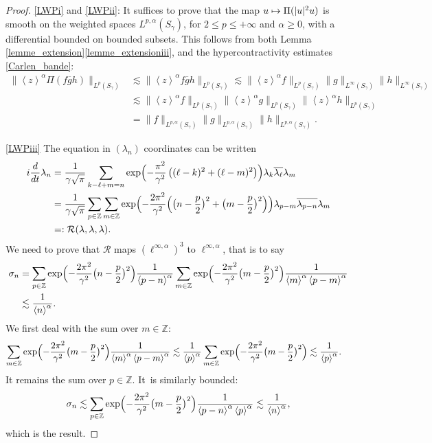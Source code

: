 \documentclass[10pt]{amsart}
\newcommand\mto{\mathchoice{\longmapsto}{\mapsto}{\mapsto}{\mapsto}}
\theoremstyle{definition}
\let\EE\exp
\let\ov\overline
\newcommand\Z{\mathbb Z}
\newcommand{\pa}[1]{\left(#1\right)}
\newcommand{\bra}[1]{\left\langle #1 \right\rangle}
\providecommand{\skpt}{\par\smallskip\noindent}
\begin{document}
\skpt
\begin{proof}
\eqref{LWPi} and \eqref{LWPii}: It suffices to prove that the map $ u \mto \Pi(|u|^2u)$ is smooth on the weighted spaces $L^{p,\alpha}(S_\gamma)$, for $2 \leq p \leq +\infty$ and $\alpha \geq 0$, with a differential bounded on bounded subsets. This follows from both Lemma \ref{lemme_extension}\eqref{lemme_extensioniii}, and the hypercontractivity estimates \eqref{Carlen_bande}:
\begin{align*}
\|\bra{z}^\alpha\Pi(f\ov{g}h)\|_{L^{p}(S_{\gamma})} &\lesssim \|\bra{z}^\alpha f\ov{g}h\|_{L^{p}(S_{\gamma})} \lesssim \|\bra{z}^\alpha f\|_{L^{p}(S_{\gamma})} \|g\|_{L^{\infty}(S_{\gamma})}\|h\|_{L^{\infty}(S_{\gamma})} \\
& \lesssim \|\bra{z}^\alpha f\|_{L^{p}(S_{\gamma})}\|\bra{z}^\alpha g\|_{L^{p}(S_{\gamma})}\|\bra{z}^\alpha h\|_{L^{p}(S_{\gamma})} \\
& = \| f\|_{L^{p,\alpha}(S_{\gamma})} \| g\|_{L^{p,\alpha}(S_{\gamma})} \| h\|_{L^{p,\alpha}(S_{\gamma})}.
\end{align*}

\eqref{LWPiii} The equation in $(\lambda_n)$ coordinates can be written
\begin{align*}
i \frac{d}{dt} \lambda_n &= \frac{1}{\gamma\sqrt{\pi}}\sum_{k-\ell+m=n}\EE \Bigl({-\frac{\pi^2}{\gamma^2}\pa{(\ell-k)^2+(\ell-m)^2}}\Bigr) \lambda_{k} \ov{\lambda_{\ell}} \lambda_{m} \\
&= \frac{1}{\gamma\sqrt{\pi}}\sum_{p\in\Z}\sum_{m\in\Z}\EE \Bigl({-\frac{2\pi^2}{\gamma^2}\Bigl(\bigl(n-\frac{p}{2}\bigr)^2+\bigl(m-\frac{p}{2}\bigr)^2}\Bigr)\Bigr) \lambda_{p-m} \ov{\lambda_{p-n}}\lambda_{m}\\
& =: \mathcal{R}(\lambda,\lambda,\lambda).
\end{align*}
We need to prove that $\mathcal{R}$ maps $(\ell^{\infty,\alpha})^3$ to $\ell^{\infty,\alpha}$, that is to say
\begin{align*}
\sigma_n &= \sum_{p\in\Z} \EE\Bigl({-\frac{2\pi^2}{\gamma^2}\bigl({n-\frac{p}{2}}}\bigr)^2\Bigr) \frac{1}{\bra{p-n}^\alpha} \sum_{m\in\Z} \EE\Bigl({-\frac{2\pi^2}{\gamma^2}\bigl({m-\frac{p}{2}}}\bigr)^2\Bigr) \frac{1}{\bra{m}^\alpha\bra{p-m}^\alpha} \\
&\lesssim \frac{1}{\bra{n}^\alpha}.
\end{align*}
We first deal with the sum over $m \in \Z$:
\begin{align*}
\sum_{m\in\Z}\EE\Bigl({-\frac{2\pi^2}{\gamma^2}\bigl({m-\frac{p}{2}}}\bigr)^2\Bigr) \frac{1}{\bra{m}^\alpha\bra{p-m}^\alpha} &\lesssim \frac{1}{\bra{p}^\alpha} \sum_{m\in\Z}\EE\Bigl({-\frac{2\pi^2}{\gamma^2}\bigl({m-\frac{p}{2}}}\bigr)^2\Bigr)\lesssim \frac{1}{\bra{p}^\alpha}.
\end{align*}
It remains the sum over $p \in \Z$. It~is similarly bounded:
\[
\sigma_n \lesssim \sum_{p\in\Z} \EE\Bigl({-\frac{2\pi^2}{\gamma^2}\bigl({m-\frac{p}{2}}}\bigr)^2\Bigr) \frac{1}{\bra{p-n}^\alpha\bra{p}^\alpha} \lesssim \frac{1}{\bra{n}^\alpha}, 
\]
which is the result.
\end{proof}
\end{document}
